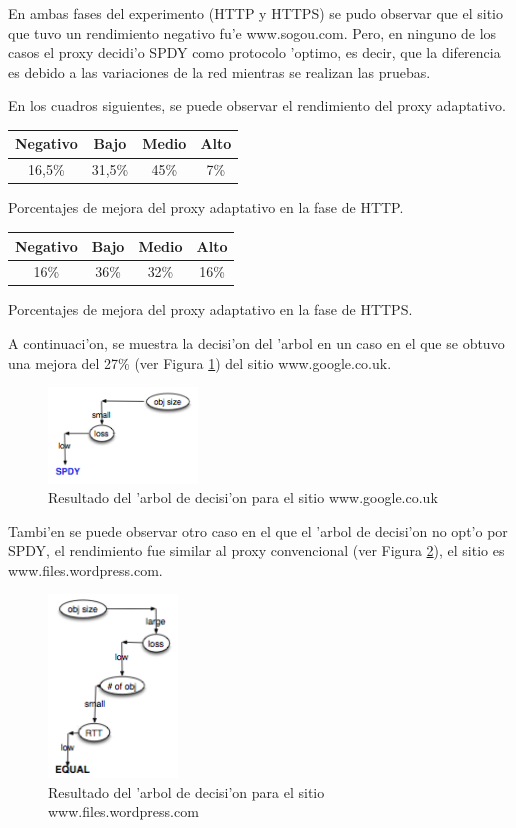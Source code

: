 \clearpage

En ambas fases del experimento (HTTP y HTTPS) se pudo observar que el sitio que tuvo un rendimiento negativo fu'e www.sogou.com. Pero, en ninguno de los casos el proxy decidi'o SPDY como protocolo 'optimo, es decir, que la diferencia es debido a las variaciones de la red mientras se realizan las pruebas.

En los cuadros siguientes, se puede observar el rendimiento del proxy adaptativo.

\begin{center}
\begin{tabular}{| c | c | c | c |}
  \hline
  Negativo & Bajo & Medio & Alto \\
  \hline
  16,5\% & 31,5\% & 45\% & 7\%\\
  \hline
\end{tabular}

Porcentajes de mejora del proxy adaptativo en la fase de HTTP.
\end{center}

\begin{center}
\begin{tabular}{| c | c | c | c |}
  \hline
  Negativo & Bajo & Medio & Alto \\
  \hline
  16\% & 36\% & 32\% & 16\%\\
  \hline
\end{tabular}

Porcentajes de mejora del proxy adaptativo en la fase de HTTPS.
\end{center}

A continuaci'on, se muestra la decisi'on del 'arbol en un caso en el que se obtuvo una mejora del 27\% (ver Figura \ref{arbolBueno}) del sitio www.google.co.uk.

\begin{figure}[h!]
  	\centering
	\includegraphics[width=150px]{img/arbolBueno}
	\caption{\small Resultado del 'arbol de decisi'on para el sitio www.google.co.uk}
	\label{arbolBueno}
\end{figure}

\clearpage

Tambi'en se puede observar otro caso en el que el 'arbol de decisi'on no opt'o por SPDY, el rendimiento fue similar al proxy convencional (ver Figura \ref{arbolMalo}), el sitio es www.files.wordpress.com.

\begin{figure}[h!]
  	\centering
	\includegraphics[width=130px]{img/arbolMalo}
	\caption{\small Resultado del 'arbol de decisi'on para el sitio www.files.wordpress.com}
	\label{arbolMalo}
\end{figure}
